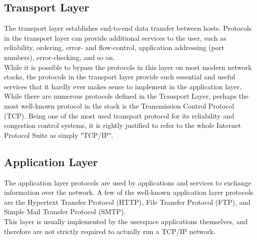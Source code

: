 \subsection{Transport Layer}
The transport layer establishes end-to-end data transfer between hosts.
Protocols in the transport layer can provide additional services to the user,
such as reliability, ordering, error- and flow-control, application addressing
(port numbers), error-checking, and so on.\\
While it is possible to bypass the protocols in this layer on most modern
network stacks, the protocols in the transport layer provide such essential
and useful services that it hardly ever makes sense to implement in the
application layer.\\
While there are numerous protocols defined in the Transport Layer, perhaps the 
most well-known protocol in the stack is the Transmission Control Protocol (TCP).
Being one of the most used transport protocol for its reliability and congestion 
control systems, it is rightly justified to refer to the whole Internet Protocol
Suite as simply "TCP/IP". 


\subsection{Application Layer}
The application layer protocols are used by applications and services to
exchange information over the network. A few of the well-known application
layer protocols are the Hypertext Transfer Protocol (HTTP)\cite{RFC1945},
File Transfer Protocol (FTP)\cite{RFC0114}, and Simple Mail Transfer Protocol
(SMTP)\cite{RFC0788}.\\
This layer is usually implemented by the userspace applications themselves, and 
therefore are not strictly required to actually run a TCP/IP network.



